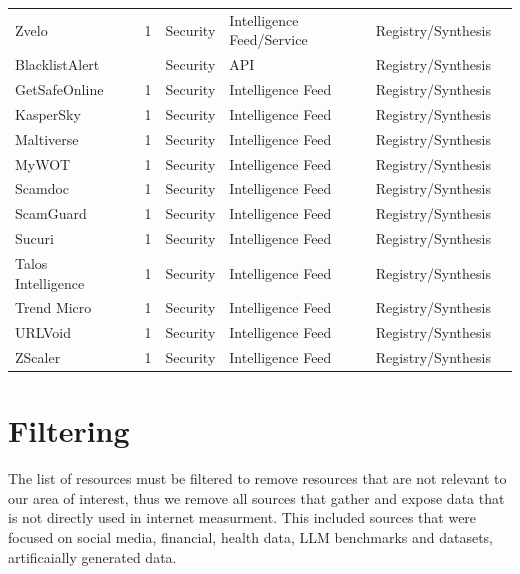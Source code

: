 \documentclass[11pt,a4paper]{article}
\begin{document}
\begin{longtable}{@{}p{}p{}p{}p{}p{}p{}p{}@{}}
Zvelo & \cite{zvelo} & 1 & Security & Intelligence Feed/Service & Registry/Synthesis & \cite{10.1145/3487552.3487853} \\
BlacklistAlert & \cite{blacklistalert} &  & Security & API & Registry/Synthesis & \cite{10.1145/3777912.3839787} \\
GetSafeOnline & \cite{getsafeonline} & 1 & Security & Intelligence Feed & Registry/Synthesis & \cite{10.1145/3777912.3839788} \\
KasperSky & \cite{kaspersky} & 1 & Security & Intelligence Feed & Registry/Synthesis & \cite{10.1145/3777912.3839789} \\
Maltiverse & \cite{maltiverse} & 1 & Security & Intelligence Feed & Registry/Synthesis & \cite{10.1145/3777912.3839790} \\
MyWOT & \cite{mywot} & 1 & Security & Intelligence Feed & Registry/Synthesis & \cite{10.1145/3777912.3839791} \\
Scamdoc & \cite{scamdoc} & 1 & Security & Intelligence Feed & Registry/Synthesis & \cite{10.1145/3777912.3839792} \\
ScamGuard & \cite{scamguard} & 1 & Security & Intelligence Feed & Registry/Synthesis & \cite{10.1145/3777912.3839793} \\
Sucuri & \cite{sucuri} & 1 & Security & Intelligence Feed & Registry/Synthesis & \cite{10.1145/3777912.3839795} \\
Talos Intelligence & \cite{talos} & 1 & Security & Intelligence Feed & Registry/Synthesis & \cite{10.1145/3777912.3839796} \\
Trend Micro & \cite{TrendMicro} & 1 & Security & Intelligence Feed & Registry/Synthesis & \cite{10.1145/3777912.3839797} \\
URLVoid & \cite{urlvoid} & 1 & Security & Intelligence Feed & Registry/Synthesis & \cite{10.1145/3777912.3839798} \\
ZScaler & \cite{zscaler} & 1 & Security & Intelligence Feed & Registry/Synthesis & \cite{10.1145/3777912.3839799} \\
\end{longtable}


\section{Filtering}
The list of resources must be filtered to remove resources that are not relevant to our area of interest, thus we remove all sources that gather and expose data that is not directly used in internet measurment.
This included sources that were focused on social media, financial, health data, LLM benchmarks and datasets, artificaially generated data.



\end{document}
